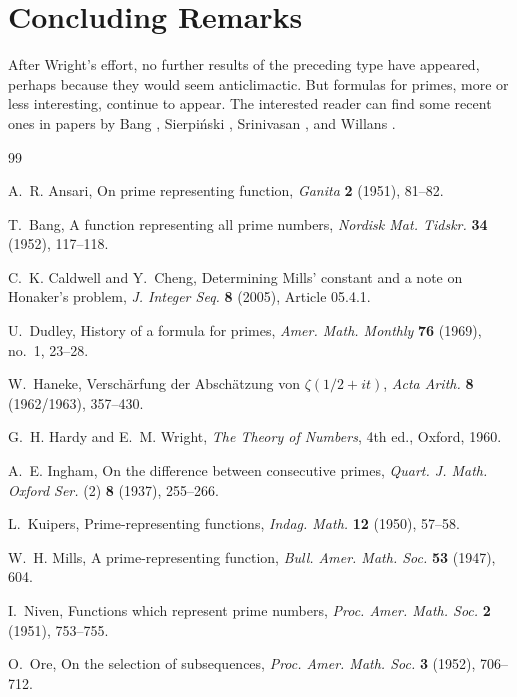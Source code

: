 \documentclass[11pt,reqno]{amsart}
\theoremstyle{blueplain}
\newcounter{type}
\numberwithin{equation}{section}
\begin{document}
\section{Concluding Remarks}

After Wright's effort, no further results of the preceding type have
appeared, perhaps because they would seem anticlimactic. But formulas for
primes, more or less interesting, continue to appear. The interested
reader can find some recent ones in papers by Bang \cite{bang},
Sierpi\'nski \cite{sierpinski}, Srinivasan \cite{srinivasan1,srinivasan2},
and Willans \cite{willans}.

\begin{thebibliography}{99}
	
	A.~R. Ansari, On prime representing function, \emph{Ganita} \textbf{2}
	(1951), 81--82.
	
	T.~Bang, A function representing all prime numbers, \emph{Nordisk Mat.
		Tidskr.} \textbf{34} (1952), 117--118.
	
	C.~K. Caldwell and Y.~Cheng, Determining Mills' constant and a note on
	Honaker's problem, \emph{J. Integer Seq.} \textbf{8} (2005), Article
	05.4.1.
	
	U.~Dudley, History of a formula for primes, \emph{Amer. Math. Monthly}
	\textbf{76} (1969), no.~1, 23--28.
	
	W.~Haneke, Versch\"arfung der Absch\"atzung von $\zeta(1/2+it)$,
	\emph{Acta Arith.} \textbf{8} (1962/1963), 357--430.
	
	G.~H. Hardy and E.~M. Wright, \emph{The Theory of Numbers}, 4th ed.,
	Oxford, 1960.
	
	A.~E. Ingham, On the difference between consecutive primes,
	\emph{Quart. J. Math. Oxford Ser.} (2) \textbf{8} (1937), 255--266.
	
	L.~Kuipers, Prime-representing functions, \emph{Indag. Math.}
	\textbf{12} (1950), 57--58.
	
	W.~H. Mills, A prime-representing function, \emph{Bull. Amer. Math. Soc.}
	\textbf{53} (1947), 604.
	
	I.~Niven, Functions which represent prime numbers, \emph{Proc. Amer.
		Math. Soc.} \textbf{2} (1951), 753--755.
	
	O.~Ore, On the selection of subsequences, \emph{Proc. Amer. Math. Soc.}
	\textbf{3} (1952), 706--712.
	

\end{thebibliography}
\end{document}
